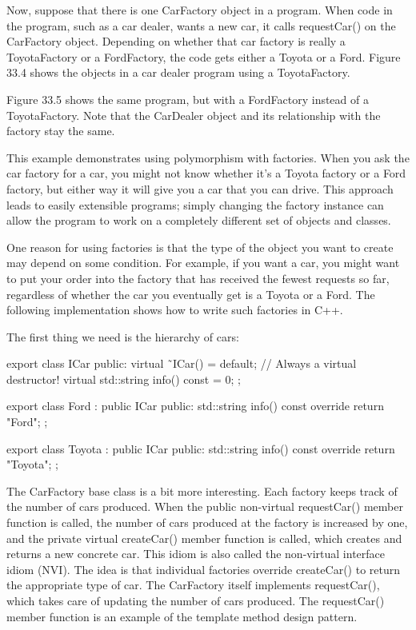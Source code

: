 Now, suppose that there is one CarFactory object in a program. When code in the program, such as a car dealer, wants a new car, it calls requestCar() on the CarFactory object. Depending on whether that car factory is really a ToyotaFactory or a FordFactory, the code gets either a Toyota or a Ford. Figure 33.4 shows the objects in a car dealer program using a ToyotaFactory.


Figure 33.5 shows the same program, but with a FordFactory instead of a ToyotaFactory. Note that the CarDealer object and its relationship with the factory stay the same.


This example demonstrates using polymorphism with factories. When you ask the car factory for a car, you might not know whether it’s a Toyota factory or a Ford factory, but either way it will give you a car that you can drive. This approach leads to easily extensible programs; simply changing the factory instance can allow the program to work on a completely different set of objects and classes.


One reason for using factories is that the type of the object you want to create may depend on some condition. For example, if you want a car, you might want to put your order into the factory that has received the fewest requests so far, regardless of whether the car you eventually get is a Toyota or a Ford. The following implementation shows how to write such factories in C++.

The first thing we need is the hierarchy of cars:

\begin{cpp}
export class ICar
{
    public:
        virtual ˜ICar() = default; // Always a virtual destructor!
        virtual std::string info() const = 0;
};

export class Ford : public ICar
{
    public:
        std::string info() const override { return "Ford"; }
};

export class Toyota : public ICar
{
    public:
        std::string info() const override { return "Toyota"; }
};
\end{cpp}

The CarFactory base class is a bit more interesting. Each factory keeps track of the number of cars produced. When the public non-virtual requestCar() member function is called, the number of cars produced at the factory is increased by one, and the private virtual createCar() member function is called, which creates and returns a new concrete car. This idiom is also called the non-virtual interface idiom (NVI). The idea is that individual factories override createCar() to return the appropriate type of car. The CarFactory itself implements requestCar(), which takes care of updating the number of cars produced. The requestCar() member function is an example of the template method design pattern.

